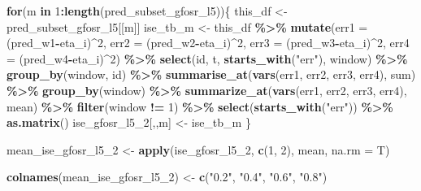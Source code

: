 \documentclass[
]{article}
\newenvironment{Shaded}{\begin{snugshade}}{\end{snugshade}}
\newcommand{\AttributeTok}[1]{\textcolor[rgb]{0.13,0.29,0.53}{#1}}
\newcommand{\ControlFlowTok}[1]{\textcolor[rgb]{0.13,0.29,0.53}{\textbf{#1}}}
\newcommand{\DecValTok}[1]{\textcolor[rgb]{0.00,0.00,0.81}{#1}}
\newcommand{\FunctionTok}[1]{\textcolor[rgb]{0.13,0.29,0.53}{\textbf{#1}}}
\newcommand{\NormalTok}[1]{#1}
\newcommand{\OtherTok}[1]{\textcolor[rgb]{0.56,0.35,0.01}{#1}}
\newcommand{\SpecialCharTok}[1]{\textcolor[rgb]{0.81,0.36,0.00}{\textbf{#1}}}
\newcommand{\StringTok}[1]{\textcolor[rgb]{0.31,0.60,0.02}{#1}}
\begin{document}
\begin{Shaded}
\begin{Highlighting}[]
\ControlFlowTok{for}\NormalTok{(m }\ControlFlowTok{in} \DecValTok{1}\SpecialCharTok{:}\FunctionTok{length}\NormalTok{(pred\_subset\_gfosr\_l5))\{}
\NormalTok{  this\_df }\OtherTok{\textless{}{-}}\NormalTok{ pred\_subset\_gfosr\_l5[[m]]}
\NormalTok{  ise\_tb\_m }\OtherTok{\textless{}{-}}\NormalTok{ this\_df }\SpecialCharTok{\%\textgreater{}\%}
    \FunctionTok{mutate}\NormalTok{(}\AttributeTok{err1 =}\NormalTok{ (pred\_w1}\SpecialCharTok{{-}}\NormalTok{eta\_i)}\SpecialCharTok{\^{}}\DecValTok{2}\NormalTok{,}
           \AttributeTok{err2 =}\NormalTok{ (pred\_w2}\SpecialCharTok{{-}}\NormalTok{eta\_i)}\SpecialCharTok{\^{}}\DecValTok{2}\NormalTok{,}
           \AttributeTok{err3 =}\NormalTok{ (pred\_w3}\SpecialCharTok{{-}}\NormalTok{eta\_i)}\SpecialCharTok{\^{}}\DecValTok{2}\NormalTok{,}
           \AttributeTok{err4 =}\NormalTok{ (pred\_w4}\SpecialCharTok{{-}}\NormalTok{eta\_i)}\SpecialCharTok{\^{}}\DecValTok{2}\NormalTok{) }\SpecialCharTok{\%\textgreater{}\%}
    \FunctionTok{select}\NormalTok{(id, t, }\FunctionTok{starts\_with}\NormalTok{(}\StringTok{"err"}\NormalTok{), window) }\SpecialCharTok{\%\textgreater{}\%} 
    \FunctionTok{group\_by}\NormalTok{(window, id) }\SpecialCharTok{\%\textgreater{}\%} 
    \FunctionTok{summarise\_at}\NormalTok{(}\FunctionTok{vars}\NormalTok{(err1, err2, err3, err4), sum) }\SpecialCharTok{\%\textgreater{}\%} 
    \FunctionTok{group\_by}\NormalTok{(window) }\SpecialCharTok{\%\textgreater{}\%} 
    \FunctionTok{summarize\_at}\NormalTok{(}\FunctionTok{vars}\NormalTok{(err1, err2, err3, err4), mean) }\SpecialCharTok{\%\textgreater{}\%}
    \FunctionTok{filter}\NormalTok{(window }\SpecialCharTok{!=} \DecValTok{1}\NormalTok{) }\SpecialCharTok{\%\textgreater{}\%} 
    \FunctionTok{select}\NormalTok{(}\FunctionTok{starts\_with}\NormalTok{(}\StringTok{"err"}\NormalTok{)) }\SpecialCharTok{\%\textgreater{}\%} \FunctionTok{as.matrix}\NormalTok{()}
\NormalTok{  ise\_gfosr\_l5\_2[,,m] }\OtherTok{\textless{}{-}}\NormalTok{ ise\_tb\_m}
\NormalTok{\}}

\NormalTok{mean\_ise\_gfosr\_l5\_2 }\OtherTok{\textless{}{-}} \FunctionTok{apply}\NormalTok{(ise\_gfosr\_l5\_2, }\FunctionTok{c}\NormalTok{(}\DecValTok{1}\NormalTok{, }\DecValTok{2}\NormalTok{), mean, }\AttributeTok{na.rm =}\NormalTok{ T)}

\FunctionTok{colnames}\NormalTok{(mean\_ise\_gfosr\_l5\_2) }\OtherTok{\textless{}{-}} \FunctionTok{c}\NormalTok{(}\StringTok{"0.2"}\NormalTok{, }\StringTok{"0.4"}\NormalTok{, }\StringTok{"0.6"}\NormalTok{, }\StringTok{"0.8"}\NormalTok{)}
\end{Highlighting}
\end{Shaded}
\end{document}
